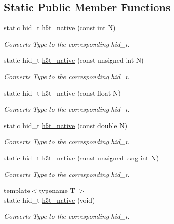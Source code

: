 \subsection*{Static Public Member Functions}
\begin{DoxyCompactItemize}
\item 
static hid\-\_\-t \hyperlink{classTReadHDF5_a7241a87bc4017e5b00e11d9bf20c769c}{h5t\-\_\-native} (const int N)
\begin{DoxyCompactList}\small\item\em Converts Type to the corresponding hid\-\_\-t. \end{DoxyCompactList}\item 
static hid\-\_\-t \hyperlink{classTReadHDF5_a897822b6771779be677168cc9b95f0c9}{h5t\-\_\-native} (const unsigned int N)
\begin{DoxyCompactList}\small\item\em Converts Type to the corresponding hid\-\_\-t. \end{DoxyCompactList}\item 
static hid\-\_\-t \hyperlink{classTReadHDF5_a563fb7bf6d6f0fabba0099acbe8e9e9e}{h5t\-\_\-native} (const float N)
\begin{DoxyCompactList}\small\item\em Converts Type to the corresponding hid\-\_\-t. \end{DoxyCompactList}\item 
static hid\-\_\-t \hyperlink{classTReadHDF5_aeac44c6e13309a8757832a629b3cdd5b}{h5t\-\_\-native} (const double N)
\begin{DoxyCompactList}\small\item\em Converts Type to the corresponding hid\-\_\-t. \end{DoxyCompactList}\item 
static hid\-\_\-t \hyperlink{classTReadHDF5_a33470f1db45a18dd3ca47f283813a216}{h5t\-\_\-native} (const unsigned long int N)
\begin{DoxyCompactList}\small\item\em Converts Type to the corresponding hid\-\_\-t. \end{DoxyCompactList}\item 
{\footnotesize template$<$typename T $>$ }\\static hid\-\_\-t \hyperlink{classTReadHDF5_a91c6970cbe98541264935070726c4155}{h5t\-\_\-native} (void)
\begin{DoxyCompactList}\small\item\em Converts Type to the corresponding hid\-\_\-t. \end{DoxyCompactList}\item 

\end{DoxyCompactItemize}
